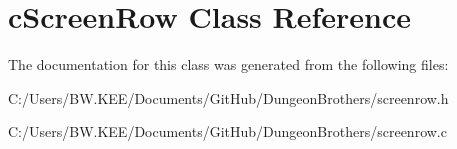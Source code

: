 \hypertarget{classc_screen_row}{\section{c\-Screen\-Row Class Reference}
\label{classc_screen_row}
}


The documentation for this class was generated from the following files\-:\begin{DoxyCompactItemize}
\item 
C\-:/\-Users/\-B\-W.\-K\-E\-E/\-Documents/\-Git\-Hub/\-Dungeon\-Brothers/screenrow.\-h\item 
C\-:/\-Users/\-B\-W.\-K\-E\-E/\-Documents/\-Git\-Hub/\-Dungeon\-Brothers/screenrow.\-c\end{DoxyCompactItemize}
